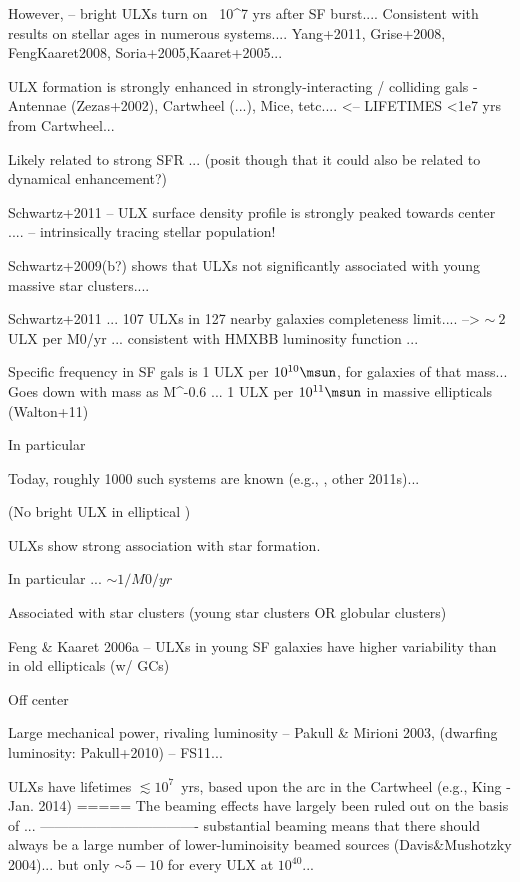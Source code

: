 However, \citet{Schwartz_2009} -- bright ULXs turn on ~10^7 yrs after SF burst.... Consistent with results on stellar ages in numerous systems....  Yang+2011, Grise+2008, FengKaaret2008, Soria+2005,Kaaret+2005...

ULX formation is strongly enhanced in strongly-interacting / colliding gals - Antennae (Zezas+2002), Cartwheel (...), Mice, tetc....    <-- LIFETIMES <1e7 yrs  from Cartwheel...

Likely related to strong SFR ... (posit though that it could also be related to dynamical enhancement?)


Schwartz+2011 -- ULX surface density profile is strongly peaked towards center .... -- intrinsically tracing stellar population!

Schwartz+2009(b?) shows that ULXs not significantly associated with young massive star clusters....

Schwartz+2011 ... 107 ULXs in 127 nearby galaxies completeness limit.... -->  $\sim~2$ ULX per  M0/yr  ... consistent with HMXBB luminosity function ...

Specific frequency in SF gals is 1 ULX per $10^{10} \msun$, for galaxies of that mass...  Goes down with mass as M^-0.6 ...   1 ULX per $10^{11} \msun$ in massive ellipticals (Walton+11)






In particular




Today, roughly 1000 such systems are known (e.g., \citep{Walton_2011}, other 2011s)...

(No bright ULX in elliptical )

ULXs show strong association with star formation.  

In particular ...
$\sim 1 / M0/yr$


Associated with star clusters (young star clusters OR globular clusters)

Feng & Kaaret 2006a -- ULXs in young SF galaxies have higher variability than in old ellipticals (w/ GCs)

Off center

Large mechanical power, rivaling luminosity -- Pakull & Mirioni 2003, (dwarfing luminosity: Pakull+2010) -- FS11...  

ULXs have lifetimes $\lesssim 10^7$~yrs, based upon the arc in the Cartwheel (e.g., King - Jan. 2014)
=====
The beaming effects have largely been ruled out on the basis of ...  
----------------------------------
substantial beaming means that there should always be a large number of lower-luminoisity beamed sources (Davis\&Mushotzky 2004)... but only $\sim5-10$ for every ULX at $10^{40}$...  

